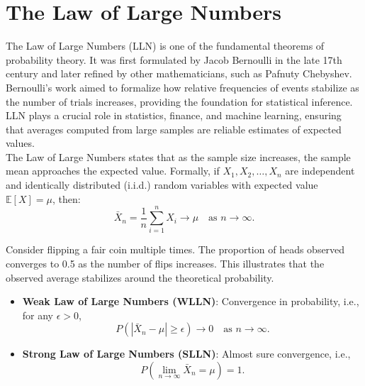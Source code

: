 \documentclass{book}
\begin{document}
 \newpage 
 
\section{The Law of Large Numbers}

The Law of Large Numbers (LLN) is one of the fundamental theorems of probability theory. It was first formulated by Jacob Bernoulli in the late 17th century and later refined by other mathematicians, such as Pafnuty Chebyshev. Bernoulli's work aimed to formalize how relative frequencies of events stabilize as the number of trials increases, providing the foundation for statistical inference. LLN plays a crucial role in statistics, finance, and machine learning, ensuring that averages computed from large samples are reliable estimates of expected values.\\

The Law of Large Numbers states that as the sample size increases, the sample mean approaches the expected value. Formally, if $X_1, X_2, \dots, X_n$ are independent and identically distributed (i.i.d.) random variables with expected value $\mathbb{E}[X] = \mu$, then:
\begin{equation}
    \bar{X}_n = \frac{1}{n} \sum_{i=1}^{n} X_i \to \mu \quad \text{as } n \to \infty.
\end{equation}

Consider flipping a fair coin multiple times. The proportion of heads observed converges to 0.5 as the number of flips increases. This illustrates that the observed average stabilizes around the theoretical probability.

\begin{itemize}
    \item \textbf{Weak Law of Large Numbers (WLLN)}: Convergence in probability, i.e., for any $\epsilon > 0$, 
    \begin{equation}
        P(|\bar{X}_n - \mu| \geq \epsilon) \to 0 \quad \text{as } n \to \infty.
    \end{equation}
    \item \textbf{Strong Law of Large Numbers (SLLN)}: Almost sure convergence, i.e.,
    \begin{equation}
        P\left( \lim_{n \to \infty} \bar{X}_n = \mu \right) = 1.
    \end{equation}
\end{itemize}
\end{document}
